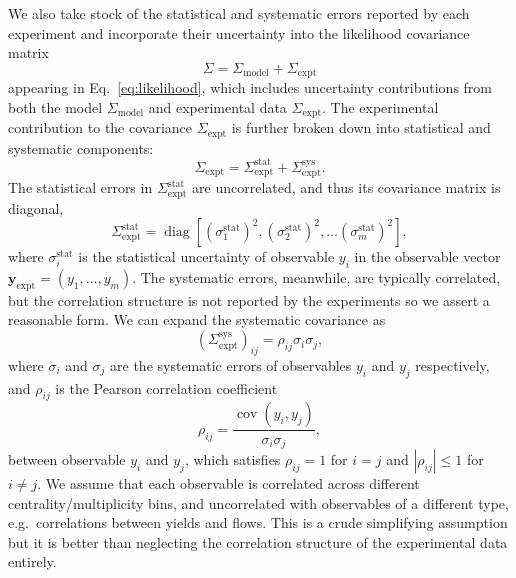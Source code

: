 \documentclass[aps,prc,reprint,amsmath,nofootinbib]{revtex4-1}
\newcommand{\ye}{{\mathbf y}_\text{expt}}
\newcommand{\Sigmam}{\Sigma_\text{model}}
\newcommand{\Sigmae}{\Sigma_\text{expt}}
\DeclareMathOperator{\diag}{diag}
\DeclareMathOperator{\cov}{cov}
\begin{document}
We also take stock of the statistical and systematic errors reported by each experiment and incorporate their uncertainty into the likelihood covariance matrix
\begin{equation}
  \Sigma = \Sigmam + \Sigmae
\end{equation}
appearing in Eq.~\eqref{eq:likelihood}, which includes uncertainty contributions from both the model $\Sigmam$ and experimental data $\Sigmae$.
The experimental contribution to the covariance $\Sigmae$ is further broken down into statistical and systematic components:
\begin{equation}
  \Sigmae = \Sigmae^\text{stat} + \Sigmae^\text{sys}.
\end{equation}
The statistical errors in $\Sigmae^\text{stat}$ are uncorrelated, and thus its covariance matrix is diagonal,
\begin{equation}
  \Sigmae^\text{stat} = \diag[(\sigma^\text{stat}_1)^2, (\sigma^\text{stat}_2)^2, \dots (\sigma^\text{stat}_m)^2 ],
\end{equation}
where $\sigma^\text{stat}_i$ is the statistical uncertainty of observable $y_i$ in the observable vector $\ye = (y_1, \dots, y_m)$.
The systematic errors, meanwhile, are typically correlated, but the correlation structure is not reported by the experiments so we assert a reasonable form.
We can expand the systematic covariance as
\begin{equation}
  (\Sigmae^\text{sys})_{ij} =  \rho_{ij} \sigma_i \sigma_j,
\end{equation}
where $\sigma_i$ and $\sigma_j$ are the systematic errors of observables $y_i$ and $y_j$ respectively, and $\rho_{ij}$ is the Pearson correlation coefficient
\begin{equation}
  \rho_{ij} = \frac{\cov(y_i, y_j)}{\sigma_i \sigma_j},
\end{equation}
between observable $y_i$ and $y_j$, which satisfies $\rho_{ij}=1$ for $i=j$ and $|\rho_{ij}| \le 1$ for $i \ne j$.
We assume that each observable is correlated across different centrality/multiplicity bins, and uncorrelated with observables of a different type, e.g.\ correlations between yields and flows.
This is a crude simplifying assumption but it is better than neglecting the correlation structure of the experimental data entirely.
\end{document}
